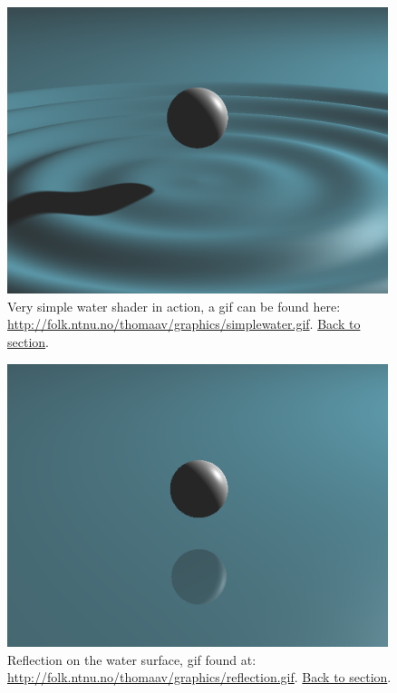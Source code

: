 \documentclass[abstract=off,oneside]{scrreprt}
\begin{document}
\begin{figure}[htb]
\centering
\includegraphics[width=0.99\textwidth]{./img/simplewater.png}
\caption*{\label{fig:simplewater}Very simple water shader in action, a gif can be found here: \url{http://folk.ntnu.no/thomaav/graphics/simplewater.gif}. \hyperref[sec:water]{Back to section}.}
\end{figure}

\begin{figure}[htb]
\centering
\includegraphics[width=0.99\textwidth]{./img/reflection.png}
\caption*{\label{fig:reflection}Reflection on the water surface, gif found at: \url{http://folk.ntnu.no/thomaav/graphics/reflection.gif}. \hyperref[sec:water]{Back to section}.}
\end{figure}
\end{document}
